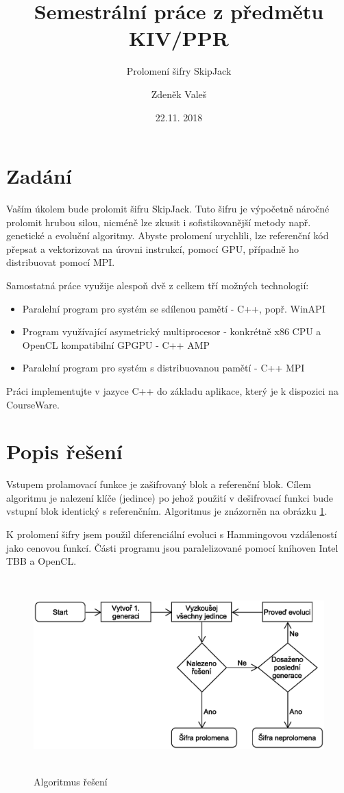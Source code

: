 \documentclass[11pt,a4paper]{scrartcl}
\begin{document}
	\title{Semestrální práce z předmětu KIV/PPR}
	\subtitle{Prolomení šifry SkipJack}
	\author{Zdeněk Valeš}
	\date{22.11. 2018}
	\maketitle
	\newpage
	
	\section{Zadání}
	Vaším úkolem bude prolomit šifru SkipJack. Tuto šifru je výpočetně náročné prolomit hrubou silou, nicméně lze zkusit i sofistikovanější metody např. genetické a evoluční algoritmy. Abyste prolomení urychlili, lze referenční kód přepsat a vektorizovat na úrovni instrukcí, pomocí GPU, případně ho distribuovat pomocí MPI.
	
	Samostatná práce využije alespoň dvě z celkem tří možných technologií:
	
	\begin{itemize}
		\item Paralelní program pro systém se sdílenou pamětí - C++, popř. WinAPI
		\item Program využívající asymetrický multiprocesor - konkrétně x86 CPU a OpenCL kompatibilní GPGPU - C++ AMP
		\item Paralelní program pro systém s distribuovanou pamětí - C++ MPI
	\end{itemize}

	Práci implementujte v jazyce C++ do základu aplikace, který je k dispozici na CourseWare.
	
	\section{Popis řešení}
	Vstupem prolamovací funkce je zašifrovaný blok a referenční blok. Cílem algoritmu je nalezení klíče (jedince) po jehož použití v dešifrovací funkci bude vstupní blok identický s referenčním. Algoritmus je znázorněn na obrázku \ref{fig:alg}.
	
	K prolomení šifry jsem použil diferenciální evoluci s Hammingovou vzdáleností jako cenovou funkcí. Části programu jsou paralelizované pomocí kníhoven Intel TBB a OpenCL.
	
	\begin{figure}[!h]
		\centering
		\includegraphics[height=7.5cm]{img/alg-flowchart}
		\caption{Algoritmus řešení}
		\label{fig:alg}
	\end{figure}
	
\end{document}
